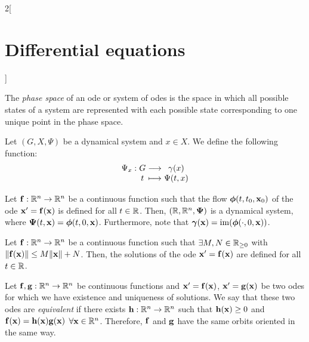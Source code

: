 \documentclass[../../../main_math.tex]{subfiles}
\begin{document}
\begin{multicols}{2}[\section{Differential equations}]
\begin{definition}
    The \emph{phase space} of an ode or system of odes is the space in which all possible states of a system are represented with each possible state corresponding to one unique point in the phase space.
  \end{definition}
  \begin{center}
    \begin{minipage}[b]{0.475\linewidth}
      \centering
      
    \end{minipage}\hfill
    \begin{minipage}[b]{0.475\linewidth}
      \centering
      
    \end{minipage}
  \end{center}
  \begin{center}
    \begin{minipage}{\linewidth}
      \centering
      
    \end{minipage}
  \end{center}
  \begin{definition}
    Let $(G,X,\Psi)$ be a dynamical system and $x\in X$. We define the following function: $$\function{\Psi_x}{G}{\gamma(x)}{t}{\Psi(t,x)}$$
  \end{definition}
  \begin{lemma}
    Let $\boldsymbol{\mathrm{f}}:\mathbb{R}^n\rightarrow\mathbb{R}^n$ be a continuous function such that the flow $\boldsymbol{\mathrm{\phi}}(t,t_0,\boldsymbol{\mathrm{x}}_0)$ of the ode $\boldsymbol{\mathrm{x}}' =\boldsymbol{\mathrm{f}}(\boldsymbol{\mathrm{x}})$ is defined for all $t\in\mathbb{R}$. Then, $(\mathbb{R},\mathbb{R}^n,\boldsymbol{\mathrm{\Psi}})$ is a dynamical system, where $\boldsymbol{\mathrm{\Psi}}(t,\boldsymbol{\mathrm{x}})=\boldsymbol{\mathrm{\phi}}(t,0,\boldsymbol{\mathrm{x}})$. Furthermore, note that $\boldsymbol{\mathrm{\gamma}}(\boldsymbol{\mathrm{x}})=\operatorname{im}(\boldsymbol{\mathrm{\phi}}(\cdot,0,\boldsymbol{\mathrm{x}}))$.
  \end{lemma}
  \begin{lemma}
    Let $\boldsymbol{\mathrm{f}}:\mathbb{R}^n\rightarrow\mathbb{R}^n$ be a continuous function such that $\exists M,N\in\mathbb{R}_{\geq 0}$ with $\|\boldsymbol{\mathrm{f}}(\boldsymbol{\mathrm{x}})\|\leq M\|\boldsymbol{\mathrm{x}}\|+N$. Then, the solutions of the ode $\boldsymbol{\mathrm{x}}' =\boldsymbol{\mathrm{f}}(\boldsymbol{\mathrm{x}})$ are defined for all $t\in\mathbb{R}$.
  \end{lemma}
  \begin{definition}
    Let $\boldsymbol{\mathrm{f}},\boldsymbol{\mathrm{g}}:\mathbb{R}^n\rightarrow\mathbb{R}^n$ be continuous functions and $\boldsymbol{\mathrm{x}}' =\boldsymbol{\mathrm{f}}(\boldsymbol{\mathrm{x}})$, $\boldsymbol{\mathrm{x}}' =\boldsymbol{\mathrm{g}}(\boldsymbol{\mathrm{x}})$ be two odes for which we have existence and uniqueness of solutions. We say that these two odes are \emph{equivalent} if there exists $\boldsymbol{\mathrm{h}}:\mathbb{R}^n\rightarrow\mathbb{R}^n$ such that $\boldsymbol{\mathrm{h}}(\boldsymbol{\mathrm{x}})\geq 0$ and $\boldsymbol{\mathrm{f}}(\boldsymbol{\mathrm{x}})=\boldsymbol{\mathrm{h}}(\boldsymbol{\mathrm{x}})\boldsymbol{\mathrm{g}}(\boldsymbol{\mathrm{x}})$ $\forall \boldsymbol{\mathrm{x}}\in\mathbb{R}^n$. Therefore, $\boldsymbol{\mathrm{f}}$ and $\boldsymbol{\mathrm{g}}$ have the same orbits oriented in the same way.

\end{definition}
\end{multicols}
\end{document}
